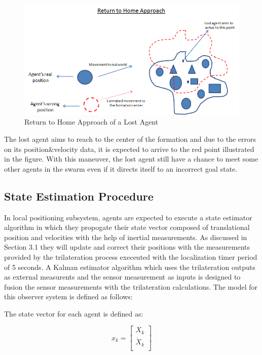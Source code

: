 \begin{figure}[H]
\caption{Return to Home Approach of a Lost Agent}
\centering
\includegraphics[scale = 0.60]{return_home}
\end{figure}
	
The lost agent aims to reach to the center of the formation and due to the errors on its position$\&$velocity data, it is expected to arrive to the red point illustrated in the figure. With this maneuver, the lost agent still have a chance to meet some other agents in the swarm even if it directs itself to an incorrect goal state.
	
\subsection{State Estimation Procedure}
In local positioning subsystem, agents are expected to execute a state estimator algorithm in which they propogate their state vector composed of translational position and velocities with the help of inertial measurements. As discussed in Section 3.1 they will update and correct their positions with the measurements provided by the trilateration process execeuted with the localization timer period of 5 seconds. A Kalman estimator algorithm which uses the trilateration outputs as external measurents and the sensor measurement as inputs is designed to fusion the sensor measurements with the trilateration calculations. The model for this observer system is defined as follows:
	
The state vector for each agent is defined as:

\begin{equation}
x_k = \begin{bmatrix}
X_k \\
\dot{X}_k\\
\end{bmatrix}
\end{equation}
	
